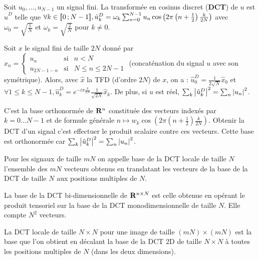 \begin{defn}
	Soit $u_0,\ldots,u_{N - 1}$ un signal fini.
	La transformée en cosinus discret (\textbf{DCT}) de $u$ est $\hat{u}^D$ telle que
	$\forall k \in \mathopen{}\mathclose{\left[\![0\mathclose{}\mathpunct{};N - 1\right]\!]}, \hat{u}^D_k = \omega_k \sum_{n = 0}^{N - 1} u_n \cos \left( 2\pi \left( n + \frac{1}{2} \right) \frac{k}{2N} \right)$
	avec $\omega_0 = \sqrt{\frac{1}{N}}$ et $\omega_k = \sqrt{\frac{2}{N}}$ pour $k \neq 0$.
\end{defn}

\begin{pop}
	Soit $x$ le signal fini de taille $2N$ donné par
	$x_n = \left\{ \begin{array}{ccl}
		u_n & \text{si} & n < N \\
		u_{2N - 1 - n} & \text{si} & N \leq n \leq 2N - 1
	\end{array}\right .$
	(concaténation du signal $u$ avec son symétrique).
	Alors, avec $\hat{x}$ la TFD (d'ordre $2N$) de $x$, on a :
	$\hat{u}^D_0 = \frac{1}{2\sqrt{N}} \hat{x}_0$
	et $\forall 1 \leq k \leq N - 1, \hat{u}_k^D = e^{-i\pi \frac{k}{2N}} \frac{1}{\sqrt{2N}} \hat{x}_k$.
	De plus, si $u$ est réel, $\sum_k \left\lvert\hat{u}_k^D\right\rvert^2 = \sum_n \left\lvert u_n\right\rvert^2$.
\end{pop}

\begin{defn}
	C'est la base orthonormée de $\mathbf{R}^n$ constituée des vecteurs indexés par $k = 0 \ldots N-1$ et de formule générale
	$n \mapsto w_k \cos \left( 2\pi \left( n + \frac{1}{2} \right) \frac{k}{2N} \right)$.
	Obtenir la DCT d'un signal c'est effectuer le produit scalaire contre ces vecteurs.
	Cette base est orthonormée car $\sum_k \left\lvert\hat{u}_k^D\right\rvert^2 = \sum_n \left\lvert u_n\right\rvert^2$.
\end{defn}

\begin{defn}
	Pour les signaux de taille $mN$ on appelle base de la DCT locale de taille $N$ l'ensemble des $mN$ vecteurs obtenus en translatant les vecteurs de la base de la DCT de taille $N$ aux positions multiples de $N$.
\end{defn}

\begin{defn}
	La base de la DCT bi-dimensionnelle de $\mathbf{R}^{n \times N}$ est celle obtenue en opérant le produit tensoriel sur la base de la DCT monodimensionnelle de taille $N$.
	Elle compte $N^2$ vecteurs.
\end{defn}

\begin{defn}
	La DCT locale de taille $N \times N$ pour une image de taille $(mN) \times (mN)$ est la base que l'on obtient en décalant la base de la DCT 2D de taille $N \times N$ à toutes les positions multiples de $N$ (dans les deux dimensions).
\end{defn}